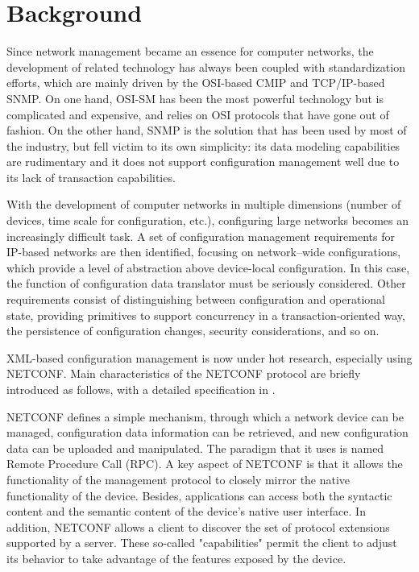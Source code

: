 \chapter{Background}
Since network management became an essence for computer networks, the development of related technology has always been coupled with standardization efforts, which are mainly driven by the OSI-based \gls{CMIP} and TCP/IP-based \gls{SNMP}. On one hand, \gls{OSI-SM} has been the most powerful technology but is complicated and expensive, and relies on OSI protocols that have gone out of fashion. On the other hand, \gls{SNMP} is the solution that has been used by most of the industry, but fell victim to its own simplicity: its data modeling capabilities are rudimentary and it does not support configuration management well due to its lack of transaction capabilities.

With the development of computer networks in multiple dimensions (number of devices, time scale for configuration, etc.), configuring large networks becomes an increasingly difficult task. A set of configuration management requirements for IP-based networks are then identified, focusing on network–wide configurations, which provide a level of abstraction above device-local configuration. In this case, the function of configuration data translator must be seriously considered. Other requirements consist of distinguishing between configuration and operational state, providing primitives to support concurrency in a transaction-oriented way, the persistence of configuration changes, security considerations, and so on.

XML-based configuration management is now under hot research, especially using \gls{NETCONF}. Main characteristics of the \gls{NETCONF} protocol are briefly introduced as follows, with a detailed specification in \cite{rfc6241}.

\gls{NETCONF} defines a simple mechanism, through which a network device can be managed, configuration data information can be retrieved, and new configuration data can be uploaded and manipulated. The paradigm that it uses is named Remote Procedure Call (RPC). A key aspect of \gls{NETCONF} is that it allows the functionality of the management protocol to closely mirror the native functionality of the device. Besides, applications can access both the syntactic content and the semantic content of the device's native user interface. In addition, \gls{NETCONF} allows a client to discover the set of protocol extensions supported by a server. These so-called "capabilities" permit the client to adjust its behavior to take advantage of the features exposed by the device.

